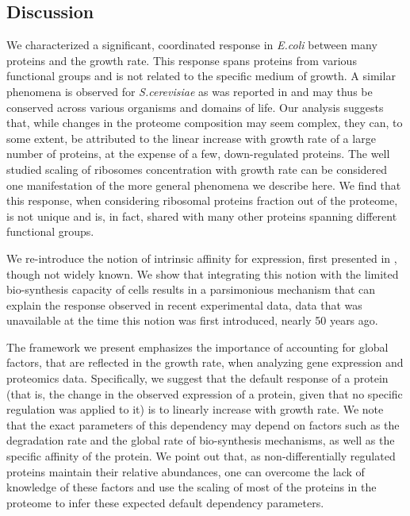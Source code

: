 \documentclass[notitlepage]{article}
\begin{document}
\subsection{Discussion}
We characterized a significant, coordinated response in \emph{E.coli} between many proteins and the growth rate.
This response spans proteins from various functional groups and is not related to the specific medium of growth.
A similar phenomena is observed for \emph{S.cerevisiae} as was reported in \cite{Keren2013a} and may thus be conserved across various organisms and domains of life.
Our analysis suggests that, while changes in the proteome composition may seem complex, they can, to some extent, be attributed to the linear increase with growth rate of a large number of proteins, at the expense of a few, down-regulated proteins.
The well studied scaling of ribosomes concentration with growth rate can be considered one manifestation of the more general phenomena we describe here.
We find that this response, when considering ribosomal proteins fraction out of the proteome, is not unique and is, in fact, shared with many other proteins spanning different functional groups.

We re-introduce the notion of intrinsic affinity for expression, first presented in \cite{Maaloe1969}, though not widely known.
We show that integrating this notion with the limited bio-synthesis capacity of cells results in a parsimonious mechanism that can explain the response observed in recent experimental data, data that was unavailable at the time this notion was first introduced, nearly 50 years ago.

The framework we present emphasizes the importance of accounting for global factors, that are reflected in the growth rate, when analyzing gene expression and proteomics data.
Specifically, we suggest that the default response of a protein (that is, the change in the observed expression of a protein, given that no specific regulation was applied to it) is to linearly increase with growth rate.
We note that the exact parameters of this dependency may depend on factors such as the degradation rate and the global rate of bio-synthesis mechanisms, as well as the specific affinity of the protein.
We point out that, as non-differentially regulated proteins maintain their relative abundances, one can overcome the lack of knowledge of these factors and use the scaling of most of the proteins in the proteome to infer these expected default dependency parameters.
\end{document}
